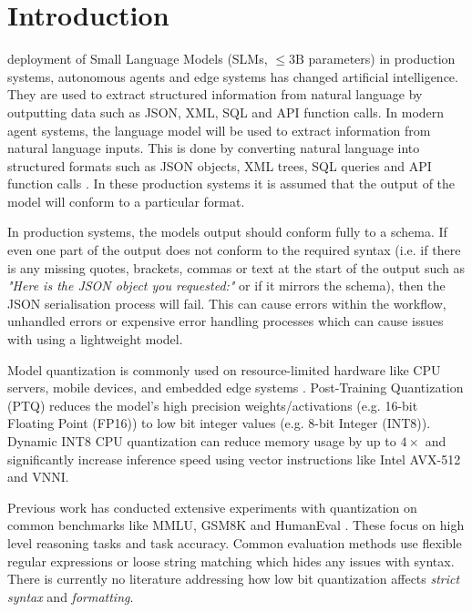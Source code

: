 \documentclass[10pt,journal,compsoc]{IEEEtran}
\begin{document}
\maketitle
\IEEEdisplaynontitleabstractindextext
\IEEEpeerreviewmaketitle

\section{Introduction}
 deployment of Small Language Models (SLMs, $\le 3\text{B}$ parameters) in production systems, autonomous agents and edge systems has changed artificial intelligence. They are used to extract structured information from natural language by outputting data such as JSON, XML, SQL and API function calls. In modern agent systems, the language model will be used to extract information from natural language inputs. This is done by converting natural language into structured formats such as JSON objects, XML trees, SQL queries and API function calls \cite{zheng2023judging, schick2023toolformer}. In these production systems it is assumed that the output of the model will conform to a particular format.

In production systems, the models output should conform fully to a schema. If even one part of the output does not conform to the required syntax (i.e. if there is any missing quotes, brackets, commas or text at the start of the output such as \emph{ "Here is the JSON object you requested:" } or if it mirrors the schema), then the JSON serialisation process will fail. This can cause errors within the workflow, unhandled errors or expensive error handling processes which can cause issues with using a lightweight model.

Model quantization is commonly used on resource-limited hardware like CPU servers, mobile devices, and embedded edge systems \cite{nagel2021white, dettmers2022llmint8}. Post-Training Quantization (PTQ) reduces the model's high precision weights/activations (e.g. 16-bit Floating Point (FP16)) to low bit integer values (e.g. 8-bit Integer (INT8)). Dynamic INT8 CPU quantization can reduce memory usage by up to $4\times$ and significantly increase inference speed using vector instructions like Intel AVX-512 and VNNI.

Previous work has conducted extensive experiments with quantization on common benchmarks like MMLU, GSM8K and HumanEval \cite{frantar2023gptq, lin2024awq}. These focus on high level reasoning tasks and task accuracy. Common evaluation methods use flexible regular expressions or loose string matching which hides any issues with syntax. There is currently no literature addressing how low bit quantization affects \emph{strict syntax} and \emph{formatting}.
\end{document}
